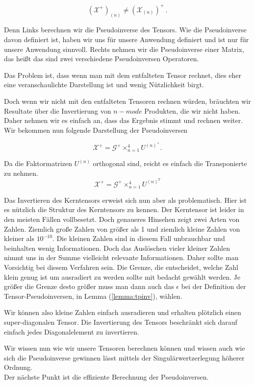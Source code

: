 \begin{equation*}
(\mathscr{X}^+)_{(n)} \neq (\mathscr{X}_{(n)})^+ \, .
\end{equation*}

Denn Links berechnen wir die Pseudoinverse des Tensors. Wie die Pseudoinverse davon definiert ist, haben wir uns für unsere Anwendung definiert und ist nur für unsere Anwendung sinnvoll. Rechts nehmen wir die Pseudoinverse einer Matrix, das heißt das sind zwei verschiedene Pseudoinversen Operatoren.

Das Problem ist, dass wenn man mit dem entfalteten Tensor rechnet, dies eher eine veranschaulichte Darstellung ist und wenig Nützlichkeit birgt.

Doch wenn wir nicht mit den entfalteten Tensoren rechnen würden, bräuchten wir Resultate über die Invertierung von $n-mode$ Produkten, die wir nicht haben. Daher nehmen wir es einfach an, dass das Ergebnis stimmt und rechnen weiter. Wir bekommen nun folgende Darstellung der Pseudoinversen

\begin{equation} \label{eq:pinv}
\pmb{\mathscr{X}}^{+} = \pmb{\mathscr{G}}^{+} \times_{n=1}^{4} U^{ (n) ^{+} }.
\end{equation}

Da die Faktormatrizen $U^{(n)}$ orthogonal sind, reicht es einfach die Transponierte zu nehmen. 
\begin{equation}
\pmb{\mathscr{X}}^+ = \pmb{\mathscr{G}}^{+} \times_{n=1}^{4} U^{ (n) ^{T} }
\end{equation}

Das Invertieren des Kerntensors erweist sich nun aber als problematisch.
Hier ist es nützlich die Struktur des Kerntensors zu kennen. Der Kerntensor ist leider in den meisten Fällen vollbesetzt. Doch genaueres Hinsehen zeigt zwei Arten von Zahlen. Ziemlich große Zahlen von größer als 1 und ziemlich kleine Zahlen von kleiner als $10^{-10}$. 
Die kleinen Zahlen sind in diesem Fall unbrauchbar und beinhalten wenig Informationen. Doch das Auslöschen vieler kleiner Zahlen nimmt uns in der Summe vielleicht relevante Informationen.
Daher sollte man Vorsichtig bei diesem Verfahren sein. Die Grenze, die entscheidet, welche Zahl klein genug ist um ausradiert zu werden sollte mit bedacht gewählt werden. Je größer die Grenze desto größer muss man dann auch das $\epsilon$ bei der Definition der Tensor-Pseudoinversen, in Lemma (\ref{lemma:tpinv}), wählen.

Wir können also kleine Zahlen einfach ausradieren und erhalten plötzlich einen super-diagonalen Tensor. Die Invertierung des Tensors beschränkt sich darauf einfach jedes Diagonalelement zu invertieren.

Wir wissen nun wie wir unsere Tensoren berechnen können und wissen auch wie sich die Pseudoinverse gewinnen lässt mittels der Singulärwertzerlegung höherer Ordnung. \\
Der nächste Punkt ist die effiziente Berechnung der Pseudoinversen.



